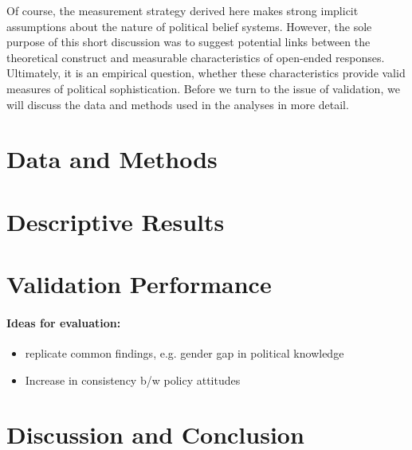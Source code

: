 \documentclass[12pt]{article}
\begin{document}
Of course, the measurement strategy derived here makes strong implicit assumptions about the nature of political belief systems. However, the sole purpose of this short discussion was to suggest potential links between the theoretical construct and measurable characteristics of open-ended responses. Ultimately, it is an empirical question, whether these characteristics provide valid measures of political sophistication. Before we turn to the issue of validation, we will discuss the data and methods used in the analyses in more detail.



\section{Data and Methods}


\section{Descriptive Results}


\section{Validation Performance}


\paragraph{Ideas for evaluation:}
\begin{itemize}\singlespacing
\item replicate common findings, e.g. gender gap in political knowledge \citep[e.g.][]{barabas2014question}
\item Increase in consistency b/w policy attitudes \citep[e.g.][]{prior2014visual}
\end{itemize}

\section{Discussion and Conclusion}


\clearpage\singlespacing\footnotesize


\end{document}
